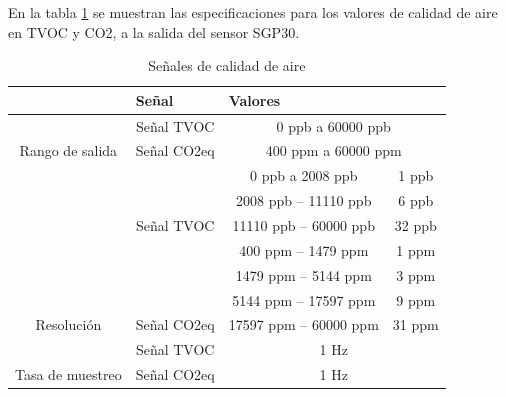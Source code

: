 En la tabla \ref{tab:señales_calidad_aire} se muestran las especificaciones para los valores de calidad de aire en TVOC y CO2, a la salida del sensor SGP30.

\begin{table}[H]
    \centering
    \caption{Señales de calidad de aire}
    \label{tab:señales_calidad_aire}
    \begin{tabular}{|c|c|cc|}
    \hline
    \rowcolor[HTML]{9698ED} 
    \multicolumn{1}{|l|}{\cellcolor[HTML]{9698ED}Parámetro} & \multicolumn{1}{l|}{\cellcolor[HTML]{9698ED}Señal} & \multicolumn{2}{l|}{\cellcolor[HTML]{9698ED}Valores} \\ \hline
                                                            & Señal TVOC                                         & \multicolumn{2}{c|}{0 ppb a 60000 ppb}               \\ \cline{2-4} 
    \multirow{-2}{*}{Rango de salida}                       & Señal CO2eq                                        & \multicolumn{2}{c|}{400 ppm a 60000 ppm}             \\ \hline
                                                            &                                                    & \multicolumn{1}{c|}{0 ppb a 2008 ppb}       & 1 ppb  \\ \cline{3-4} 
                                                            &                                                    & \multicolumn{1}{c|}{2008 ppb – 11110 ppb}   & 6 ppb  \\ \cline{3-4} 
                                                            & \multirow{-3}{*}{Señal TVOC}                       & \multicolumn{1}{c|}{11110 ppb – 60000 ppb}  & 32 ppb \\ \cline{2-4} 
                                                            &                                                    & \multicolumn{1}{c|}{400 ppm – 1479 ppm}     & 1 ppm  \\ \cline{3-4} 
                                                            &                                                    & \multicolumn{1}{c|}{1479 ppm – 5144 ppm}    & 3 ppm  \\ \cline{3-4} 
                                                            &                                                    & \multicolumn{1}{c|}{5144 ppm – 17597 ppm}   & 9 ppm  \\ \cline{3-4} 
    \multirow{-7}{*}{Resolución}                            & \multirow{-4}{*}{Señal CO2eq}                      & \multicolumn{1}{c|}{17597 ppm – 60000 ppm}  & 31 ppm \\ \hline
                                                            & Señal TVOC                                         & \multicolumn{2}{c|}{1 Hz}                            \\ \cline{2-4} 
    \multirow{-2}{*}{Tasa de muestreo}                      & Señal CO2eq                                        & \multicolumn{2}{c|}{1 Hz}                            \\ \hline
    \end{tabular}
\end{table}

